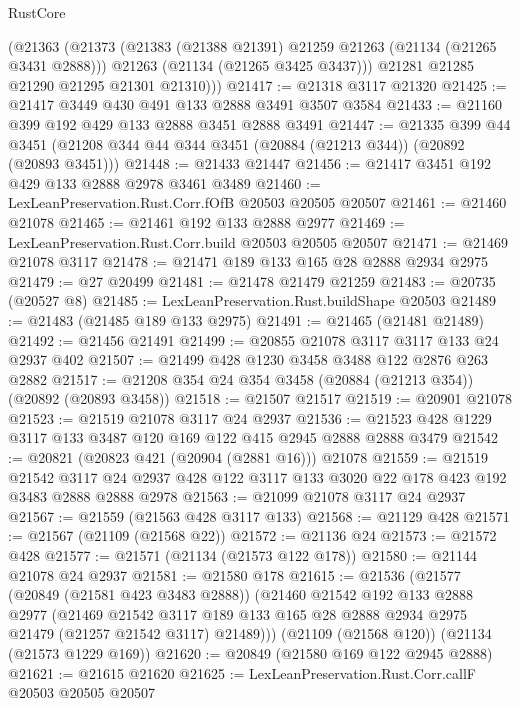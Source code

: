 \begin{lexlean}{RustCore}
\begin{coremodule}
        (@21363
          (@21373
            (@21383 (@21388 @21391) @21259 @21263 (@21134 (@21265 @3431 @2888)))
            @21263
            (@21134 (@21265 @3425 @3437)))
          @21281
          @21285
          @21290
          @21295
          @21301
          @21310)))
@21417 := @21318 @3117 @21320
@21425 := @21417 @3449 @430 @491 @133 @2888 @3491 @3507 @3584
@21433 := @21160 @399 @192 @429 @133 @2888 @3451 @2888 @3491
@21447 := @21335
    @399
    @44
    @3451
    (@21208 @344 @44 @344 @3451 (@20884 (@21213 @344)) (@20892 (@20893 @3451)))
@21448 := @21433 @21447
@21456 := @21417 @3451 @192 @429 @133 @2888 @2978 @3461 @3489
@21460 := LexLeanPreservation.Rust.Corr.fOfB @20503 @20505 @20507
@21461 := @21460 @21078
@21465 := @21461 @192 @133 @2888 @2977
@21469 := LexLeanPreservation.Rust.Corr.build @20503 @20505 @20507
@21471 := @21469 @21078 @3117
@21478 := @21471 @189 @133 @165 @28 @2888 @2934 @2975
@21479 := @27 @20499
@21481 := @21478 @21479 @21259
@21483 := @20735 (@20527 @8)
@21485 := LexLeanPreservation.Rust.buildShape @20503
@21489 := @21483 (@21485 @189 @133 @2975)
@21491 := @21465 (@21481 @21489)
@21492 := @21456 @21491
@21499 := @20855 @21078 @3117 @3117 @133 @24 @2937 @402
@21507 := @21499 @428 @1230 @3458 @3488 @122 @2876 @263 @2882
@21517 := @21208 @354 @24 @354 @3458 (@20884 (@21213 @354)) (@20892 (@20893 @3458))
@21518 := @21507 @21517
@21519 := @20901 @21078
@21523 := @21519 @21078 @3117 @24 @2937
@21536 := @21523 @428 @1229 @3117 @133 @3487 @120 @169 @122 @415 @2945 @2888 @2888 @3479
@21542 := @20821 (@20823 @421 (@20904 (@2881 @16))) @21078
@21559 := @21519
    @21542
    @3117
    @24
    @2937
    @428
    @122
    @3117
    @133
    @3020
    @22
    @178
    @423
    @192
    @3483
    @2888
    @2888
    @2978
@21563 := @21099 @21078 @3117 @24 @2937
@21567 := @21559 (@21563 @428 @3117 @133)
@21568 := @21129 @428
@21571 := @21567 (@21109 (@21568 @22))
@21572 := @21136 @24
@21573 := @21572 @428
@21577 := @21571 (@21134 (@21573 @122 @178))
@21580 := @21144 @21078 @24 @2937
@21581 := @21580 @178
@21615 := @21536
    (@21577
      (@20849 (@21581 @423 @3483 @2888))
      (@21460
        @21542
        @192
        @133
        @2888
        @2977
        (@21469
          @21542
          @3117
          @189
          @133
          @165
          @28
          @2888
          @2934
          @2975
          @21479
          (@21257 @21542 @3117)
          @21489)))
    (@21109 (@21568 @120))
    (@21134 (@21573 @1229 @169))
@21620 := @20849 (@21580 @169 @122 @2945 @2888)
@21621 := @21615 @21620
@21625 := LexLeanPreservation.Rust.Corr.callF @20503 @20505 @20507

\end{coremodule}
\end{lexlean}
